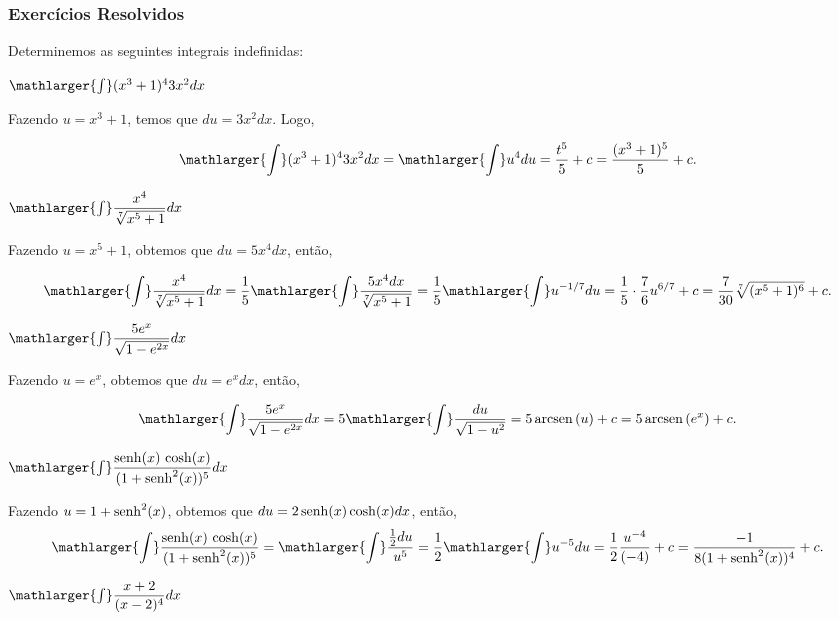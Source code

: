 \cleardoublepage\documentclass[../main.tex]{subfiles}
\begin{document}
\subsubsection{Exercícios Resolvidos}
\begin{exeresol}
  Determinemos as seguintes integrais indefinidas:
  \begin{compactenum}[a)]
  \item  \(\mathlarger{\int} (x^3+1)^4 3x^2dx\)
  
  \begin{solution}
  Fazendo \(u=x^3+1\), temos que \(du=3x^2 dx\). Logo,

\[ \mathlarger{\int} (x^3+1)^4 3x^2dx= \mathlarger{\int} u^4du=\dfrac{t^5}{5}+c=\dfrac{(x^3+1)^5}{5}+c. \]
  \end{solution}
  \item \(\mathlarger{\int} \dfrac{x^4}{\sqrt[7]{x^5+1}}dx\)
  
  \begin{solution}
  Fazendo \(u=x^5+1\), obtemos que \(du=5x^4dx\), então,

\[ \mathlarger{\int} \dfrac{x^4}{\sqrt[7]{x^5+1}}dx=\dfrac{1}{5}\mathlarger{\int} \dfrac{5x^4dx}{\sqrt[7]{x^5+1}}= \dfrac{1}{5}\mathlarger{\int} u^{-1/7}du=\dfrac{1}{5}\cdot\dfrac{7}{6}u^{6/7}+c=\dfrac{7}{30}\sqrt[7]{(x^5+1)^6}+c. \]
  \end{solution}
  \item \(\mathlarger{\int} \dfrac{5e^x}{\sqrt{1-e^{2x}}}dx\)\\
  
  \begin{solution}
  Fazendo \(u=e^x\), obtemos que \(du=e^xdx\), então,

\[ \mathlarger{\int} \dfrac{5e^x}{\sqrt{1-e^{2x}}}dx=5\mathlarger{\int} \dfrac{du}{\sqrt{1-u^{2}}}=5\,{\rm arcsen\,}(u)+c=5\,{\rm arcsen\,}(e^x)+c. \]
  \end{solution}
  \item \(\mathlarger{\int} \dfrac{{\rm senh}(x)\,\cosh(x) }{(1+{\rm senh}^2 (x))^5}dx\)
  
  \begin{solution}
  Fazendo \(u=1+{\rm senh}^2 (x)\), obtemos que \(du=2\,{\rm senh}(x) \cosh (x) dx\), então,
\[ \mathlarger{\int} \dfrac{{\rm senh}(x)\,\cosh( x) }{(1+{\rm senh}^2 (x))^5}= \mathlarger{\int} \dfrac{\frac{1}{2}du}{u^5}=\dfrac{1}{2}\mathlarger{\int} u^{-5}du = \dfrac{1}{2}\dfrac{u^{-4}}{(-4)} +c =\dfrac{-1}{8(1+{\rm senh}^2 (x))^4}+c. \]
  \end{solution}
  \item \( \mathlarger{\int} \dfrac{x+2}{(x-2)^4}dx\)\\
  

\end{compactenum}
\end{exeresol}
\end{document}

